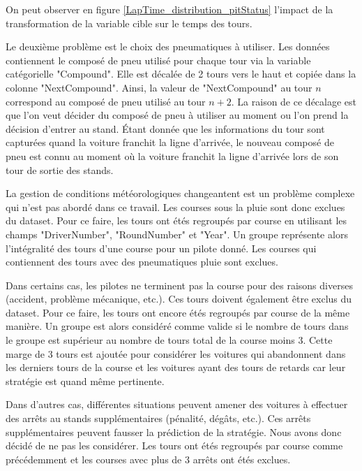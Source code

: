 On peut observer en figure \ref{LapTime_distribution_pitStatus} l'impact de la transformation de la variable cible sur le temps des tours.


Le deuxième problème est le choix des pneumatiques à utiliser.
Les données contiennent le composé de pneu utilisé pour chaque tour via la variable catégorielle "Compound".
Elle est décalée de 2 tours vers le haut et copiée dans la colonne "NextCompound". Ainsi, la valeur de "NextCompound" au tour $n$ correspond au composé de pneu utilisé au tour $n+2$.
La raison de ce décalage est que l'on veut décider du composé de pneu à utiliser au moment ou l'on prend la décision d'entrer au stand.
Étant donnée que les informations du tour sont capturées quand la voiture franchit la ligne d'arrivée,
le nouveau composé de pneu est connu au moment où la voiture franchit la ligne d'arrivée lors de son tour de sortie des stands.

La gestion de conditions météorologiques changeantent est un problème complexe qui n'est pas abordé dans ce travail.
Les courses sous la pluie sont donc exclues du dataset. Pour ce faire, les tours ont étés regroupés par course en utilisant les champs "DriverNumber", "RoundNumber" et "Year".
Un groupe représente alors l'intégralité des tours d'une course pour un pilote donné. Les courses qui contiennent des tours avec des pneumatiques pluie sont exclues.

Dans certains cas, les pilotes ne terminent pas la course pour des raisons diverses (accident, problème mécanique, etc.).
Ces tours doivent également être exclus du dataset. Pour ce faire, les tours ont encore étés regroupés par course de la même manière.
Un groupe est alors considéré comme valide si le nombre de tours dans le groupe est supérieur au nombre de tours total de la course moins 3.
Cette marge de 3 tours est ajoutée pour considérer les voitures qui abandonnent dans les derniers tours de la course et les voitures ayant des tours de retards car leur stratégie est quand même pertinente.

Dans d'autres cas, différentes situations peuvent amener des voitures à effectuer des arrêts au stands supplémentaires (pénalité, dégâts, etc.).
Ces arrêts supplémentaires peuvent fausser la prédiction de la stratégie. Nous avons donc décidé de ne pas les considérer.
Les tours ont étés regroupés par course comme précédemment et les courses avec plus de 3 arrêts ont étés exclues.

